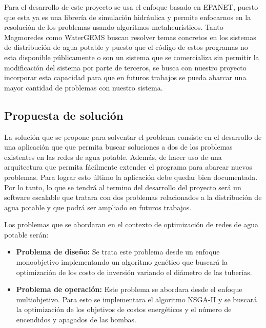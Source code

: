 \documentclass[11pt,letterpaper]{article}
\begin{document}
Para el desarrollo de este proyecto se usa el enfoque basado en EPANET, puesto que esta ya es una librería de simulación hidráulica y permite enfocarnos en la resolución de los problemas usando algoritmos metaheurísticos. Tanto Magmoredes como WaterGEMS buscan resolver temas concretos en los sistemas de distribución de agua potable y puesto que el código de estos programas no esta disponible públicamente o son un sistema que se comercializa sin permitir la modificación del sistema por parte de terceros, se busca con nuestro proyecto incorporar esta capacidad para que en futuros trabajos se pueda abarcar una mayor cantidad de problemas con nuestro sistema.

\subsection{Propuesta de solución}


La solución que se propone para solventar el problema consiste en el desarrollo de una aplicación que 
que permita buscar soluciones a dos de los problemas existentes en las redes de agua potable. Además, de hacer uso de una arquitectura que permita fácilmente extender el programa para abarcar nuevos problemas. Para lograr esto  último la aplicación debe quedar bien documentada. Por lo tanto, lo que se tendrá al termino del desarrollo del proyecto será un software escalable que tratara con dos problemas relacionados a la distribución de agua potable y que podrá ser ampliado en futuros trabajos.

Los problemas que se abordaran en el contexto de optimización de redes de agua potable serán:
\begin{itemize}
	\item \textbf{Problema de diseño:} Se trata este problema desde un enfoque monoobjetivo implementando un algoritmo genético que buscará la optimización de los costo de inversión variando el diámetro de las tuberías.  
	\item \textbf{Problema de operación:} Este problema se abordara desde el enfoque multiobjetivo. Para esto se implementara el algoritmo NSGA-II y se buscará la optimización de los objetivos de costos energéticos y el número de encendidos y apagados de las bombas.
\end{itemize}
\end{document}
